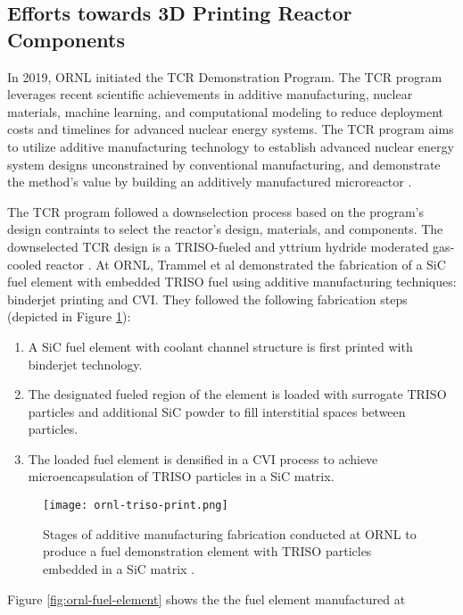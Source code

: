 \subsection{Efforts towards 3D Printing Reactor Components}
In 2019, \gls{ORNL} initiated the \gls{TCR} Demonstration Program.
The \gls{TCR} program leverages recent scientific achievements in additive 
manufacturing, nuclear materials, machine learning, and computational modeling
to reduce deployment costs and timelines for advanced nuclear energy systems. 
The \gls{TCR} program aims to utilize additive manufacturing technology to 
establish advanced nuclear energy system designs unconstrained by conventional 
manufacturing, and demonstrate the method's value by building an additively 
manufactured microreactor \cite{terrani_transformational_2019}. 

The \gls{TCR} program followed a downselection process based on the program's 
design contraints to select the reactor's design, materials, and components.
The downselected TCR design is a TRISO-fueled and yttrium hydride moderated 
gas-cooled reactor \cite{betzler_transformational_2020}.
At \gls{ORNL}, Trammel et al \cite{trammell_advanced_2019} demonstrated 
the fabrication of a SiC fuel element with embedded \gls{TRISO} fuel using 
additive manufacturing techniques: binderjet printing and \gls{CVI}. 
They followed the following fabrication steps (depicted in Figure 
\ref{fig:ornl-triso-print}): 
\begin{enumerate}
    \item A SiC fuel element with coolant channel structure is first printed with 
    binderjet technology. 
    \item The designated fueled region of the element is loaded with surrogate 
    \gls{TRISO} particles and additional SiC powder to fill interstitial spaces
    between particles. 
    \item The loaded fuel element is densified in a \gls{CVI} process to achieve 
    microencapsulation of \gls{TRISO} particles in a SiC matrix. 
\end{enumerate}
\begin{figure}[]
    \centering
    \texttt{[image: ornl-triso-print.png]} 
    \caption{Stages of additive manufacturing fabrication conducted at \acrlong{ORNL} to 
    produce a fuel demonstration element with \gls{TRISO} particles embedded in 
    a SiC matrix \cite{trammell_advanced_2019}.}
    \label{fig:ornl-triso-print}
\end{figure}
Figure \ref{fig:ornl-fuel-element} shows the the fuel element manufactured at 
